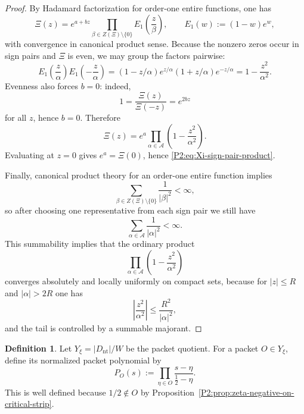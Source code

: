 \documentclass[11pt,a4paper]{article}
\numberwithin{equation}{section}
\theoremstyle{definition}
\newtheorem{definition}[theorem]{Definition}
\theoremstyle{remark}
\begin{document}
\begin{proof}
By Hadamard factorization for order-one entire functions, one has
\[
\Xi(z)=e^{a+bz}\prod_{\beta\in Z(\Xi)\setminus\{0\}} E_1\!\left(\frac{z}{\beta}\right),
\qquad
E_1(w):=(1-w)e^w,
\]
with convergence in canonical product sense.  Because the nonzero zeros occur in sign pairs and $\Xi$ is even, we may group the factors pairwise:
\[
E_1\!\left(\frac{z}{\alpha}\right)E_1\!\left(-\frac{z}{\alpha}\right)
=(1-z/\alpha)e^{z/\alpha}(1+z/\alpha)e^{-z/\alpha}
=1-\frac{z^2}{\alpha^2}.
\]
Evenness also forces $b=0$: indeed,
\[
1=\frac{\Xi(z)}{\Xi(-z)}=e^{2bz}
\]
for all $z$, hence $b=0$.  Therefore
\[
\Xi(z)=e^a\prod_{\alpha\in\mathcal A}\left(1-\frac{z^2}{\alpha^2}\right).
\]
Evaluating at $z=0$ gives $e^a=\Xi(0)$, hence \eqref{P2:eq:Xi-sign-pair-product}.

Finally, canonical product theory for an order-one entire function implies
\[
\sum_{\beta\in Z(\Xi)\setminus\{0\}} \frac{1}{|\beta|^2}<\infty,
\]
so after choosing one representative from each sign pair we still have
\[
\sum_{\alpha\in\mathcal A}\frac{1}{|\alpha|^2}<\infty.
\]
This summability implies that the ordinary product
\[
\prod_{\alpha\in\mathcal A}\left(1-\frac{z^2}{\alpha^2}\right)
\]
converges absolutely and locally uniformly on compact sets, because for $|z|\le R$ and $|\alpha|>2R$ one has
\[
\left|\frac{z^2}{\alpha^2}\right|\le \frac{R^2}{|\alpha|^2},
\]
and the tail is controlled by a summable majorant.
\end{proof}

\begin{definition}\label{P2:def:packet-polynomial}
Let $Y_\xi=|D_{\mathrm{nt}}|/W$ be the packet quotient.  For a packet $O\in Y_\xi$, define its normalized packet polynomial by
\begin{equation}\label{P2:eq:packet-polynomial-def}
P_O(s):=\prod_{\eta\in O}\frac{s-\eta}{\frac12-\eta}.
\end{equation}
This is well defined because $1/2\notin O$ by Proposition~\ref{P2:prop:zeta-negative-on-critical-strip}.
\end{definition}
\end{document}
